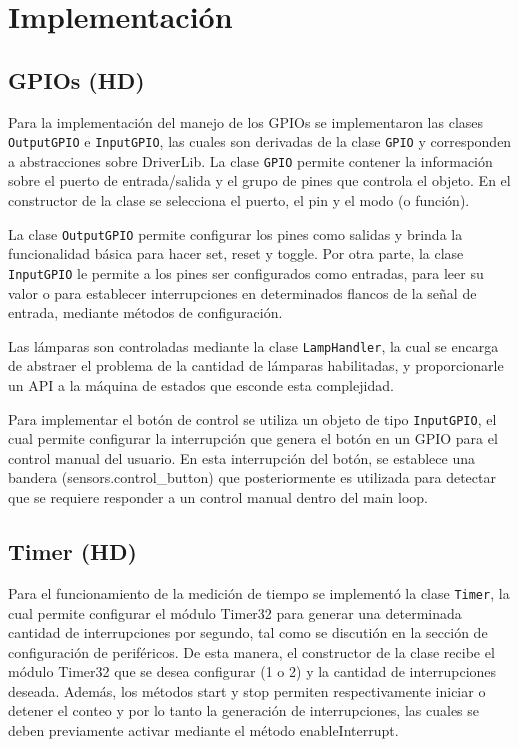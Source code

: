 \section{Implementación}

\subsection{GPIOs (HD)}
Para la implementación del manejo de los GPIOs se implementaron las clases \texttt{OutputGPIO} e
\texttt{InputGPIO}, las cuales son derivadas de la clase \texttt{GPIO} y corresponden a
abstracciones sobre DriverLib. La clase \texttt{GPIO} permite contener la información sobre el
puerto de entrada/salida y el grupo de pines que controla el objeto. En el constructor de la clase
se selecciona el puerto, el pin y el modo (o función). 

La clase \texttt{OutputGPIO} permite configurar los pines como salidas y brinda la funcionalidad
básica para hacer set, reset y toggle. Por otra parte, la clase \texttt{InputGPIO} le permite a los
pines ser configurados como entradas, para leer su valor o para establecer interrupciones en
determinados flancos de la señal de entrada, mediante métodos de configuración.

Las lámparas son controladas mediante la clase \texttt{LampHandler}, la cual se encarga de abstraer
el problema de la cantidad de lámparas habilitadas, y proporcionarle un API a la máquina de estados
que esconde esta complejidad.

Para implementar el botón de control se utiliza un objeto de tipo \texttt{InputGPIO}, el cual
permite configurar la interrupción que genera el botón en un GPIO para el control manual del
usuario. En esta interrupción del botón, se establece una bandera (sensors.control\_button) que
posteriormente es utilizada para detectar que se requiere responder a un control manual dentro del
main loop.

\subsection{Timer (HD)}
Para el funcionamiento de la medición de tiempo se implementó la clase \texttt{Timer}, la cual
permite configurar el módulo Timer32 para generar una determinada cantidad de interrupciones por
segundo, tal como se discutión en la sección de configuración de periféricos. De esta manera, el
constructor de la clase recibe el módulo Timer32 que se desea configurar (1 o 2) y la cantidad de
interrupciones deseada. Además, los métodos start y stop permiten respectivamente iniciar o detener
el conteo y por lo tanto la generación de interrupciones, las cuales se deben previamente activar
mediante el método enableInterrupt. 

